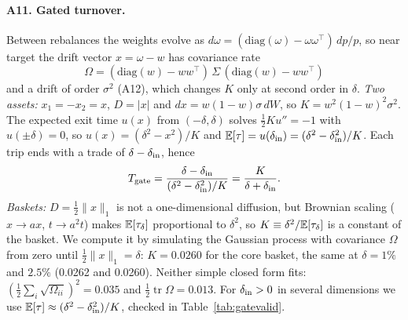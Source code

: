 \paragraph{A11. Gated turnover.} Between rebalances the weights evolve as $d\omega=(\mathrm{diag}(\omega)-\omega\omega^{\top})\,dp/p$, so near target the drift vector $x=\omega-w$ has covariance rate
\begin{equation}
\Omega=(\mathrm{diag}(w)-ww^{\top})\,\Sigma\,(\mathrm{diag}(w)-ww^{\top})
\end{equation}
and a drift of order $\sigma^2$ (A12), which changes $K$ only at second order in $\delta$. \emph{Two assets:} $x_1=-x_2=x$, $D=|x|$ and $dx=w(1-w)\sigma\,dW$, so $K=w^2(1-w)^2\sigma^2$. The expected exit time $u(x)$ from $(-\delta,\delta)$ solves $\tfrac12Ku''=-1$ with $u(\pm\delta)=0$, so $u(x)=(\delta^2-x^2)/K$ and $\mathbb{E}[\tau]=u(\delta_{\mathrm{in}})=(\delta^2-\delta_{\mathrm{in}}^2)/K$. Each trip ends with a trade of $\delta-\delta_{\mathrm{in}}$, hence
\begin{equation}
T_{\mathrm{gate}}=\frac{\delta-\delta_{\mathrm{in}}}{(\delta^2-\delta_{\mathrm{in}}^2)/K}=\frac{K}{\delta+\delta_{\mathrm{in}}}.
\end{equation}
\emph{Baskets:} $D=\tfrac12\|x\|_1$ is not a one-dimensional diffusion, but Brownian scaling ($x\to ax$, $t\to a^2t$) makes $\mathbb{E}[\tau_\delta]$ proportional to $\delta^2$, so $K\equiv\delta^2/\mathbb{E}[\tau_\delta]$ is a constant of the basket. We compute it by simulating the Gaussian process with covariance $\Omega$ from zero until $\tfrac12\|x\|_1=\delta$: $K=0.0260$ for the core basket, the same at $\delta=1\%$ and $2.5\%$ (0.0262 and 0.0260). Neither simple closed form fits: $(\tfrac12\sum_i\sqrt{\Omega_{ii}})^2=0.035$ and $\tfrac12\operatorname{tr}\Omega=0.013$. For $\delta_{\mathrm{in}}>0$ in several dimensions we use $\mathbb{E}[\tau]\approx(\delta^2-\delta_{\mathrm{in}}^2)/K$, checked in Table~\ref{tab:gatevalid}.

